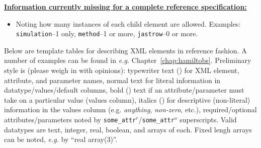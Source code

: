 \textbf{\underline{Information currently missing for a complete reference specification:}}
\begin{itemize}
  \item{Noting how many instances of each child element are allowed.  Examples: \texttt{simulation}--1 only, \texttt{method}--1 or more, \texttt{jastrow}--0 or more}.
\end{itemize}


Below are template tables for describing XML elements in reference fashion.  A number of examples can be found in \textit{e.g.} Chapter~\ref{chap:hamiltobs}.  Preliminary style is (please weigh in with opinions): typewriter text (\ilatex{\\texttt\{\}}) for XML element, attribute, and parameter names, normal text for literal information in datatype/values/default columns, bold (\ilatex{\\textbf\{\}}) text if an attribute/parameter must take on a particular value (values column), italics (\ilatex{\\textit\{\}}) for descriptive (non-literal) information in the values column (e.g. \textit{anything}, \textit{non-zero}, etc.), required/optional attributes/parameters noted by \texttt{some\_attr$^r$}/\texttt{some\_attr$^o$} superscripts.  Valid datatypes are text, integer, real, boolean, and arrays of each.  Fixed lengh arrays can be noted, \textit{e.g.} by ``real array(3)''.


